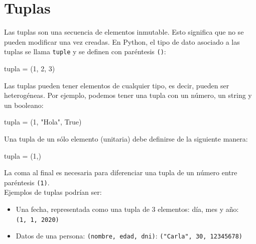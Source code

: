 \documentclass[
  letterpaper,
  DIV=11,
  numbers=noendperiod]{scrreprt}
\newenvironment{Shaded}{\begin{snugshade}}{\end{snugshade}}
\newcommand{\DecValTok}[1]{\textcolor[rgb]{0.68,0.00,0.00}{#1}}
\newcommand{\NormalTok}[1]{\textcolor[rgb]{0.00,0.23,0.31}{#1}}
\newcommand{\OperatorTok}[1]{\textcolor[rgb]{0.37,0.37,0.37}{#1}}
\newcommand{\StringTok}[1]{\textcolor[rgb]{0.13,0.47,0.30}{#1}}
\newcommand{\VariableTok}[1]{\textcolor[rgb]{0.07,0.07,0.07}{#1}}
\providecommand{\tightlist}{%
  \setlength{\itemsep}{0pt}\setlength{\parskip}{0pt}}\usepackage{longtable,booktabs,array}
\begin{document}
\section{Tuplas}\label{tuplas}

Las tuplas son una secuencia de elementos inmutable. Esto significa que
no se pueden modificar una vez creadas. En Python, el tipo de dato
asociado a las tuplas se llama \texttt{tuple} y se definen con
paréntesis \texttt{()}:

\begin{Shaded}
\begin{Highlighting}[]
\NormalTok{tupla }\OperatorTok{=}\NormalTok{ (}\DecValTok{1}\NormalTok{, }\DecValTok{2}\NormalTok{, }\DecValTok{3}\NormalTok{)}
\end{Highlighting}
\end{Shaded}

Las tuplas pueden tener elementos de cualquier tipo, es decir, pueden
ser heterogéneas. Por ejemplo, podemos tener una tupla con un número, un
string y un booleano:

\begin{Shaded}
\begin{Highlighting}[]
\NormalTok{tupla }\OperatorTok{=}\NormalTok{ (}\DecValTok{1}\NormalTok{, }\StringTok{"Hola"}\NormalTok{, }\VariableTok{True}\NormalTok{)}
\end{Highlighting}
\end{Shaded}

Una tupla de un sólo elemento (unitaria) debe definirse de la siguiente
manera:

\begin{Shaded}
\begin{Highlighting}[]
\NormalTok{tupla }\OperatorTok{=}\NormalTok{ (}\DecValTok{1}\NormalTok{,)}
\end{Highlighting}
\end{Shaded}

La coma al final es necesaria para diferenciar una tupla de un número
entre paréntesis \texttt{(1)}.\\

Ejemplos de tuplas podrían ser:

\begin{itemize}
\tightlist
\item
  Una fecha, representada como una tupla de 3 elementos: día, mes y año:
  \texttt{(1,\ 1,\ 2020)}
\item
  Datos de una persona: \texttt{(nombre,\ edad,\ dni)}:
  \texttt{("Carla",\ 30,\ 12345678)}
\end{itemize}
\end{document}
